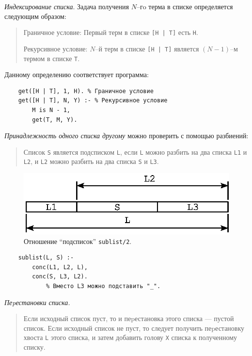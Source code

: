 \documentclass[12pt, openany, twoside]{book} %
\begin{document}
\emph{Индексирование списка}. Задача получения $N$--гo терма в списке определяется следующим образом:

\begin{quote}
\noindent Граничное условие: Первый терм в списке {\tt [Н | Т]} есть {\tt Н}.

\noindent Рекурсивное условие: $N$--й терм в списке {\tt [Н | Т]} является $(N-1)$--м термом в списке {\tt Т}.
\end{quote}

Данному определению соответствует программа:

{\tt\begin{verbatim}
    get([H | Т], 1, Н). % Граничное условие
    get([Н | Т], N, Y) :- % Рекурсивное условие
        М is N - 1,
        get(Т, М, Y).
\end{verbatim}}

\emph{Принадлежность одного списка другому} можно проверить с помощью разбиений:

\begin{quote}
    Список {\tt S} является подсписком {\tt L}, если {\tt L} можно разбить на два списка {\tt L1} и {\tt L2}, и {\tt L2} можно разбить на два списка {\tt S} и {\tt L3}.
\end{quote}

\begin{figure}[hbt]
\begin{center}
\includegraphics[scale=0.7]{pics/list_inc.eps}
\end{center}
\caption{Отношение ``подсписок'' {\tt sublist/2}.}
\label{pic:list_inc}
\end{figure}

{\tt\begin{verbatim}
    sublist(L, S) :-
        conc(L1, L2, L),
        conc(S, L3, L2).
            % Вместо L3 можно подставить "_".
\end{verbatim}}


\emph {Пеpестановки списка.}

\begin{quote}
     \noindent Если исходный список пуст, то и пеpестановка этого списка --- пустой список.
     \noindent Если исходный список не пуст, то следует получить пеpестановку хвоста {\tt L} этого списка, и затем добавить голову {\tt X} списка к полученному списку.
\end{quote}
\end{document}
